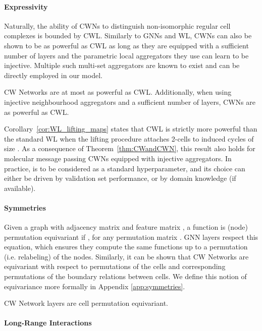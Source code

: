 \documentclass{article}
\begin{document}
\paragraph{Expressivity} Naturally, the ability of CWNs to distinguish non-isomorphic regular cell complexes is bounded by CWL. Similarly to GNNs and WL, CWNs can also be shown to be as powerful as CWL as long as they are equipped with a sufficient number of layers and the parametric local aggregators they use can learn to be injective. Multiple such multi-set aggregators \citep{GIN, Corso2020_PNA} are known to exist and can be directly employed in our model.   

\begin{theorem}
\label{thm:CWandCWN}
CW Networks are at most as powerful as CWL. Additionally, when using injective neighbourhood aggregators and a sufficient number of layers, CWNs are as powerful as CWL.
\end{theorem}

Corollary~\ref{cor:WL_lifting_maps} states that CWL is strictly more powerful than the standard WL when the lifting procedure attaches 2-cells to induced cycles of size . As a consequence of Theorem~\ref{thm:CWandCWN}, this result also holds for molecular message passing CWNs equipped with injective aggregators. In practice,  is to be considered as a standard hyperparameter, and its choice can either be driven by validation set performance, or by domain knowledge (if available).

\paragraph{Symmetries} Given a graph  with adjacency matrix  and feature matrix , a function  is (node) permutation equivariant if , for any permutation matrix . GNN layers respect this equation, which ensures 
they compute the same functions up to a permutation (i.e. relabeling) of the nodes. Similarly, it can be shown that CW Networks are equivariant with respect to permutations of the cells and corresponding permutations of the boundary relations  between cells. We define this notion of equivariance more formally in Appendix \ref{app:symmetries}.    

\begin{theorem}
\label{thm:CWequivariant}
CW Network layers are cell permutation equivariant. 
\end{theorem}

\paragraph{Long-Range Interactions} 
\end{document}
